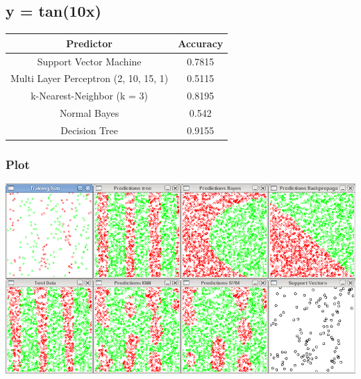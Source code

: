 \subsection{y = tan(10x)}

\begin{tabular}{|c|c|}
\hline
Predictor &	Accuracy\\ \hline\hline
Support Vector Machine & 0.7815\\ \hline
Multi Layer Perceptron (2, 10, 15, 1) &	0.5115\\ \hline
k-Nearest-Neighbor (k = 3) & 0.8195\\ \hline
Normal Bayes &	0.542\\ \hline
Decision Tree &	0.9155\\ \hline
\end{tabular}

\subsubsection{Plot}
 \includegraphics[scale=0.4]{img/eval/tan10x.png}

